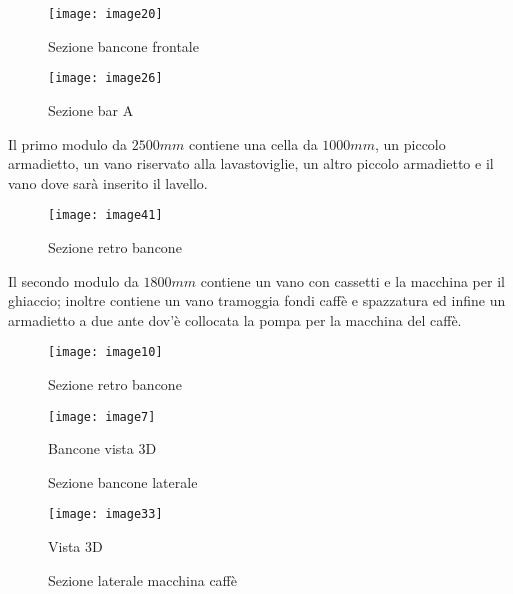 \begin{figure}[H]
	\centering
	\texttt{[image: image20]}
	\caption{Sezione bancone frontale}
	\label{fig:mesh1}
\end{figure}

\begin{figure}[H]
	\centering
	\texttt{[image: image26]}
	\caption{Sezione bar A}
\end{figure}

\noindent
Il primo modulo da $2500mm$ contiene una cella da $1000 mm$, un piccolo armadietto, un vano riservato alla lavastoviglie, un altro piccolo armadietto e il vano dove sarà inserito il lavello.

\begin{figure}[H]
	\centering
	\texttt{[image: image41]}
	\caption{Sezione retro bancone}
\end{figure}

\noindent
Il secondo modulo da $1800 mm$ contiene un vano con cassetti e la macchina per il ghiaccio; inoltre contiene un vano tramoggia fondi caffè e spazzatura ed infine un armadietto a due ante dov'è collocata la pompa per la macchina del caffè.

\begin{figure}[H]
	\centering
	\texttt{[image: image10]}
	\caption{Sezione retro bancone}
\end{figure}
\begin{figure}[H]
	\centering
	\texttt{[image: image7]}
	\caption{Bancone vista 3D}
\end{figure}

\begin{figure}[H]
	\captionsetup[subfloat]{farskip=2pt,captionskip=8pt}
	\centering
	\hspace{1cm}
	
	\caption{Sezione bancone laterale}
	\label{fig:sezione bancone}
\end{figure}

\begin{figure}[H]
	\centering
	\texttt{[image: image33]}
	\caption{Vista 3D}
\end{figure}

\begin{figure}[H]
	\captionsetup[subfloat]{farskip=2pt,captionskip=8pt}
	\centering
	\hspace{1cm}
	
	\caption{Sezione laterale macchina caffè}
	\label{fig:sezionemacchinacaffe}
\end{figure}



